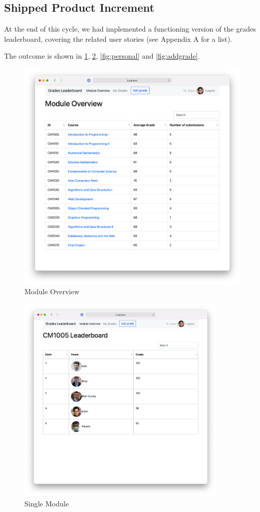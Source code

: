 \subsection{Shipped Product Increment}
At the end of this cycle, we had implemented a functioning version of the grades leaderboard, covering the related user stories (see Appendix A for a list). 

The outcome is shown in \cref{fig:moduleoverview}, \cref{fig:module}, \cref{fig:personal} and \cref{fig:addgrade}.

\begin{figure}[H]
    \centering
    \includegraphics[width=15cm]{images/moduleoverview.png}
    \caption{Module Overview}
    \label{fig:moduleoverview}
\end{figure}

\begin{figure}[H]
    \centering
    \includegraphics[width=10cm]{images/module.png}
    \caption{Single Module}
    \label{fig:module}
\end{figure}

